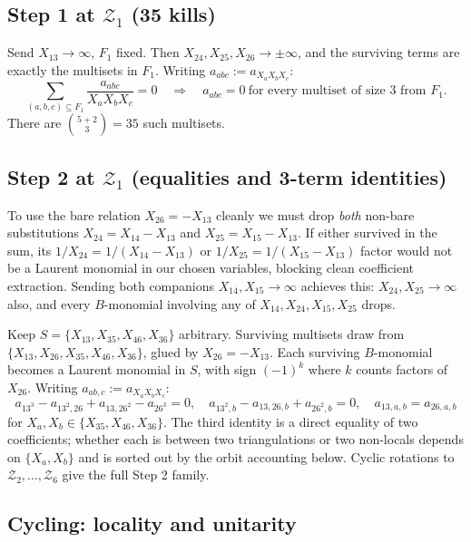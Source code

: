 \documentclass[11pt]{article}
\newcommand{\Zr}{\mathcal{Z}}
\newcommand{\Fr}{F}
\begin{document}
\subsection{Step 1 at $\Zr_1$ (35 kills)}

Send $X_{13}\to\infty$, $\Fr_1$ fixed.  Then $X_{24},X_{25},X_{26}\to\pm\infty$,
and the surviving terms are exactly the multisets in $\Fr_1$.
Writing $a_{abc} := a_{X_aX_bX_c}$:
\[
\sum_{(a,b,c)\subseteq\Fr_1}\frac{a_{abc}}{X_aX_bX_c}=0
\quad\Longrightarrow\quad
\boxed{a_{abc}=0\ \text{for every multiset of size 3 from }\Fr_1.}
\]
There are $\binom{5+2}{3}=35$ such multisets.

\subsection{Step 2 at $\Zr_1$ (equalities and 3-term identities)}

To use the bare relation $X_{26}=-X_{13}$ cleanly we must drop
\emph{both} non-bare substitutions $X_{24}=X_{14}-X_{13}$ and
$X_{25}=X_{15}-X_{13}$.  If either survived in the sum, its
$1/X_{24}=1/(X_{14}-X_{13})$ or $1/X_{25}=1/(X_{15}-X_{13})$ factor
would not be a Laurent monomial in our chosen variables, blocking
clean coefficient extraction.  Sending both companions
$X_{14},X_{15}\to\infty$ achieves this: $X_{24},X_{25}\to\infty$
also, and every $B$-monomial involving any of $X_{14},X_{24},X_{15},X_{25}$ drops.

Keep $S=\{X_{13},X_{35},X_{46},X_{36}\}$ arbitrary.  Surviving
multisets draw from $\{X_{13},X_{26},X_{35},X_{46},X_{36}\}$, glued
by $X_{26}=-X_{13}$.  Each surviving $B$-monomial becomes a
Laurent monomial in $S$, with sign $(-1)^k$ where $k$ counts
factors of $X_{26}$.  Writing $a_{ab,c}:=a_{X_aX_bX_c}$:
\[
\boxed{a_{13^3}-a_{13^2,26}+a_{13,26^2}-a_{26^3}=0,\quad
a_{13^2,b}-a_{13,26,b}+a_{26^2,b}=0,\quad
a_{13,a,b}=a_{26,a,b}}
\]
for $X_a, X_b\in\{X_{35},X_{46},X_{36}\}$.  The third identity is
a direct equality of two coefficients; whether each is between two
triangulations or two non-locals depends on $\{X_a, X_b\}$ and is
sorted out by the orbit accounting below.  Cyclic rotations to
$\Zr_2,\dots,\Zr_6$ give the full Step 2 family.

\subsection{Cycling: locality and unitarity}
\end{document}
